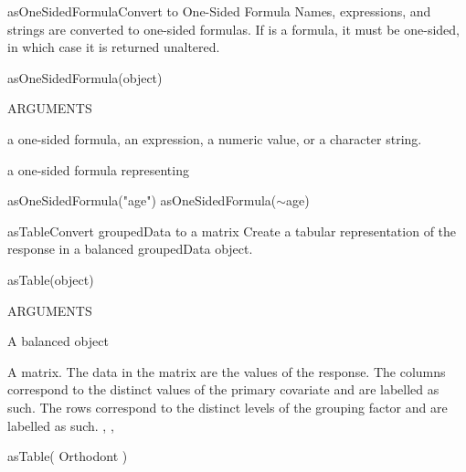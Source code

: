 \documentclass[pdftex]{article} \usepackage{url,graphicx}
\renewcommand{\Twiddle}{\mbox{\(\sim\)}}
\begin{document}
\begin{Helpfile}{asOneSidedFormula}{Convert to One-Sided Formula}
Names, expressions, and strings are converted to one-sided
formulas. If  is a formula, it must be one-sided, in
which case it is returned unaltered.
\begin{Example}
asOneSidedFormula(object)
\end{Example}
\begin{Argument}{ARGUMENTS}
\item[\Co{object:}]
a one-sided formula, an expression, a numeric value, or a character
string.
\end{Argument}
a one-sided formula representing 
\need 15pt
\vspace{-16pt} 
\begin{Example}
asOneSidedFormula("age")
asOneSidedFormula(\Twiddle age)
\end{Example}
\end{Helpfile}
\begin{Helpfile}{asTable}{Convert groupedData to a matrix}
Create a tabular representation of the response in a balanced
groupedData object.
\begin{Example}
asTable(object)
\end{Example}
\begin{Argument}{ARGUMENTS}
\item[\Co{object:}]
A balanced  object
\end{Argument}
A matrix.  The data in the matrix are the values of the response.  The
columns correspond to the distinct values of the primary covariate and
are labelled as such.  The rows correspond to the distinct levels of
the grouping factor and are labelled as such.
, ,
\need 15pt
\vspace{-16pt} 
\begin{Example}
asTable( Orthodont )
\end{Example}
\end{Helpfile}
\end{document}
